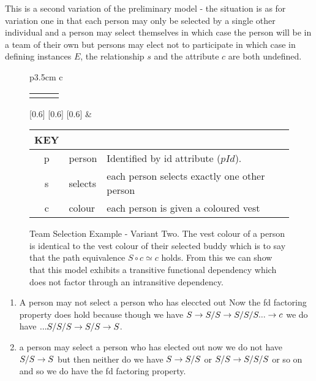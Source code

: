 
This is a second variation of the preliminary model - the situation is as for variation one in that  each person may only be selected by a single other individual and a person may select themselves in which case the person will be in a team of their own but persons may elect not to participate in which case
in defining instances $E$, the relationship $s$ and the attribute $c$ are both undefined.

\begin{figure} [h]
\begin{center}
\begin{tabular}{p{3.5cm} c}
\begin{tabular}{c p{1.5cm} c}
   \Rnode{p}{p} & & \Rnode{v}{v}
\end{tabular}
[0.6]
[0.6]
[0.6]
\idcomp
& \footnotesize
\begin{tabular}{c p{1.5cm} p{4cm}}
KEY && \\
\hline
p & person & Identified by id attribute ($pId$). \\
s & selects & each person selects exactly one other person \\
c & colour & each person is given a coloured vest 
\end{tabular} 
\end{tabular}
\end{center}
\caption{Team Selection Example  - Variant Two. The  vest colour  of a person is 
identical to the vest colour of their selected buddy which is to say that the path equivalence $S \circ c \simeq c$ holds. From this
we can show that this model exhibits a transitive functional dependency which does not factor through an intransitive dependency.
}
\label{teamselectionvarianttwoERschema}
\end{figure}

\begin{enumerate}
\item
A person may not select a person who has eleccted out 
Now the fd factoring property does hold because though we have $S \rightarrow S/S \rightarrow S/S/S ... \rightarrow c$ 
we do have $... S/S/S \rightarrow S/S \rightarrow S$.
\item
a person may select a person who has elected out
now we do not have $S/S \rightarrow S$ but then neither do we have $S \rightarrow S/S$ or $S/S \rightarrow S/S/S$ or so on and so we do have the fd factoring property.
\end{enumerate}

